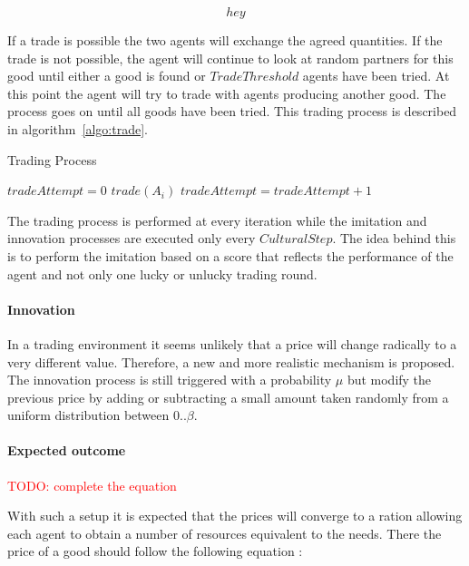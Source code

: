 \documentclass{wscpaperproc}
\newcommand{\memo}[2]{\textcolor{#1}{#2}}
\newcommand{\todo}[1]{\memo{red}{TODO: #1\\}}
\begin{document}
$$ hey $$

If a trade is possible the two agents will exchange the agreed quantities. If the trade is not possible, the agent will continue to look at random partners for this good until either a good is found or $TradeThreshold$ agents have been tried. At this point the agent will try to trade with agents producing another good. The process goes on until all goods have been tried. This trading process is described in algorithm~\ref{algo:trade}.

\begin{algorithm}
\caption{Trading Process}
\label{algo:trade}
	\begin{algorithmic}[1]
	\scriptsize
			\State $tradeAttempt = 0$
					\State $trade(A_i)$
				\Else
					\State $tradeAttempt = tradeAttempt + 1$					
				\EndIf
			\EndFor
		\EndFor
\end{algorithmic}
\end{algorithm}

The trading process is performed at every iteration while the imitation and innovation processes are executed only every $CulturalStep$. The idea behind this is to perform the imitation based on a score that reflects the performance of the agent and not only one lucky or unlucky trading round.

\paragraph{Innovation} In a trading environment it seems unlikely that a price will change radically to a very different value. Therefore, a new and more realistic mechanism is proposed. The innovation process is still triggered with a probability $\mu$ 
but modify the previous price by adding or subtracting a small amount taken randomly from a uniform  distribution between $0 .. \beta$.


\paragraph{Expected outcome} 

\todo{complete the equation}

With such a setup it is expected that the prices will converge to a ration allowing each agent to obtain a number of resources equivalent to the needs. There the price of a good should follow the following equation :
\end{document}

